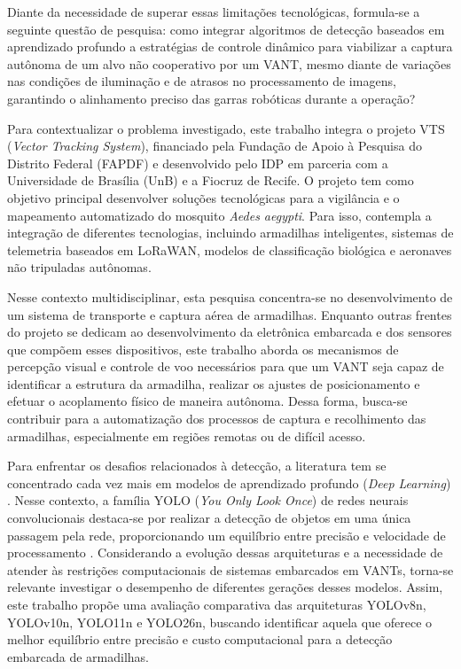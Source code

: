 Diante da necessidade de superar essas limitações tecnológicas, formula-se a seguinte questão de pesquisa: como integrar algoritmos de detecção baseados em aprendizado profundo a estratégias de controle dinâmico para viabilizar a captura autônoma de um alvo não cooperativo por um VANT, mesmo diante de variações nas condições de iluminação e de atrasos no processamento de imagens, garantindo o alinhamento preciso das garras robóticas durante a operação?

Para contextualizar o problema investigado, este trabalho integra o projeto VTS (\textit{Vector Tracking System}), financiado pela Fundação de Apoio à Pesquisa do Distrito Federal (FAPDF) e desenvolvido pelo IDP em parceria com a Universidade de Brasília (UnB) e a Fiocruz de Recife. O projeto tem como objetivo principal desenvolver soluções tecnológicas para a vigilância e o mapeamento automatizado do mosquito \textit{Aedes aegypti}. Para isso, contempla a integração de diferentes tecnologias, incluindo armadilhas inteligentes, sistemas de telemetria baseados em LoRaWAN, modelos de classificação biológica e aeronaves não tripuladas autônomas.

Nesse contexto multidisciplinar, esta pesquisa concentra-se no desenvolvimento de um sistema de transporte e captura aérea de armadilhas. Enquanto outras frentes do projeto se dedicam ao desenvolvimento da eletrônica embarcada e dos sensores que compõem esses dispositivos, este trabalho aborda os mecanismos de percepção visual e controle de voo necessários para que um VANT seja capaz de identificar a estrutura da armadilha, realizar os ajustes de posicionamento e efetuar o acoplamento físico de maneira autônoma. Dessa forma, busca-se contribuir para a automatização dos processos de captura e recolhimento das armadilhas, especialmente em regiões remotas ou de difícil acesso.

Para enfrentar os desafios relacionados à detecção, a literatura tem se concentrado cada vez mais em modelos de aprendizado profundo (\textit{Deep Learning}) \cite{amjoud2023}. Nesse contexto, a família YOLO (\textit{You Only Look Once}) de redes neurais convolucionais destaca-se por realizar a detecção de objetos em uma única passagem pela rede, proporcionando um equilíbrio entre precisão e velocidade de processamento \cite{afifah2025, amjoud2023, adegun2024}. Considerando a evolução dessas arquiteturas e a necessidade de atender às restrições computacionais de sistemas embarcados em VANTs, torna-se relevante investigar o desempenho de diferentes gerações desses modelos. Assim, este trabalho propõe uma avaliação comparativa das arquiteturas YOLOv8n, YOLOv10n, YOLO11n e YOLO26n, buscando identificar aquela que oferece o melhor equilíbrio entre precisão e custo computacional para a detecção embarcada de armadilhas.

